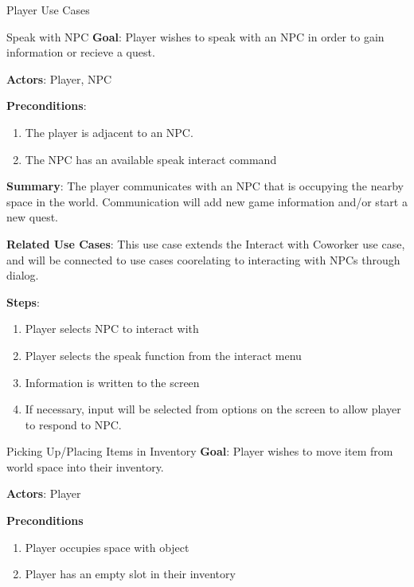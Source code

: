 \documentclass[12pt]{report}
\begin{document}
  \begin{section}{Player Use Cases}
    \begin{subsection}{Speak with NPC}
      \textbf{Goal}:
      Player wishes to speak with an NPC in order to gain information or recieve 
      a quest.
      
      \textbf{Actors}:
      Player, NPC

      \textbf{Preconditions}:
      \begin{enumerate}
        \item The player is adjacent to an NPC.
        \item The NPC has an available speak interact command
      \end{enumerate}

      \textbf{Summary}:
      The player communicates with an NPC that is occupying the nearby space 
      in the world. Communication will add new game information and/or start
      a new quest.

      \textbf{Related Use Cases}:
      This use case extends the Interact with Coworker use case, and will be 
      connected to use cases coorelating to interacting with NPCs through 
      dialog.

      \textbf{Steps}:
      \begin{enumerate}
        \item Player selects NPC to interact with
        \item Player selects the speak function from the interact menu
        \item Information is written to the screen
        \item If necessary, input will be selected from options on the screen
	      to allow player to respond to NPC.
      \end{enumerate}
    \end{subsection}



    \begin{subsection}{Picking Up/Placing Items in Inventory}
       \textbf{Goal}:
      Player wishes to move item from world space into their inventory.
      
      \textbf{Actors}:
      Player

      \textbf{Preconditions}
      \begin{enumerate}
        \item Player occupies space with object
        \item Player has an empty slot in their inventory
      \end{enumerate}


\end{subsection}
\end{section}
\end{document}
